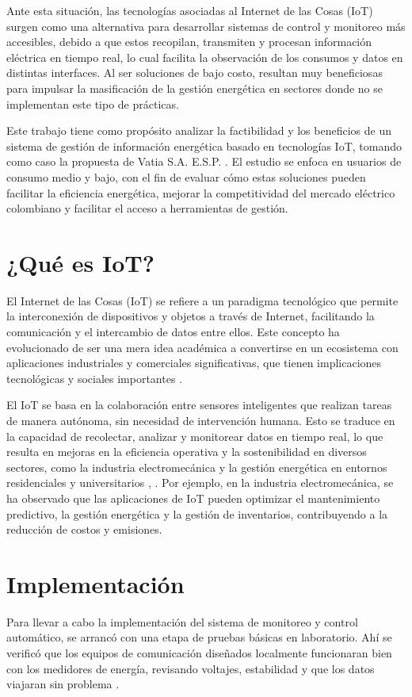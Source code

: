 Ante esta situación, las tecnologías asociadas al Internet de las Cosas (IoT) surgen como una alternativa para desarrollar sistemas de control y monitoreo más accesibles, debido a que estos recopilan, transmiten y procesan información eléctrica en tiempo real, lo cual facilita la observación de los consumos y datos en distintas interfaces. Al ser soluciones de bajo costo, resultan muy beneficiosas para impulsar la masificación de la gestión energética en sectores donde no se implementan este tipo de prácticas.

Este trabajo tiene como propósito analizar la factibilidad y los beneficios de un sistema de gestión de información energética basado en tecnologías IoT, tomando como caso la propuesta de Vatia S.A. E.S.P. \cite{Jaramillo2022}. El estudio se enfoca en usuarios de consumo medio y bajo, con el fin de evaluar cómo estas soluciones pueden facilitar la eficiencia energética, mejorar la competitividad del mercado eléctrico colombiano y facilitar el acceso a herramientas de gestión.

\section{¿Qué es IoT?}
El Internet de las Cosas (IoT) se refiere a un paradigma tecnológico que permite la interconexión de dispositivos y objetos a través de Internet, facilitando la comunicación y el intercambio de datos entre ellos. Este concepto ha evolucionado de ser una mera idea académica a convertirse en un ecosistema con aplicaciones industriales y comerciales significativas, que tienen implicaciones tecnológicas y sociales importantes \cite{MoralesTamayoYoandrys2025AdId}.

El IoT se basa en la colaboración entre sensores inteligentes que realizan tareas de manera autónoma, sin necesidad de intervención humana. Esto se traduce en la capacidad de recolectar, analizar y monitorear datos en tiempo real, lo que resulta en mejoras en la eficiencia operativa y la sostenibilidad en diversos sectores, como la industria electromecánica y la gestión energética en entornos residenciales y universitarios \cite{OlivaresGorritiEneko2022Eydd}, \cite{RomeroMacíasJavierVidal2025Adid}.
Por ejemplo, en la industria electromecánica, se ha observado que las aplicaciones de IoT pueden optimizar el mantenimiento predictivo, la gestión energética y la gestión de inventarios, contribuyendo a la reducción de costos y emisiones.


\section{Implementación}
Para llevar a cabo la implementación del sistema de monitoreo y control automático, se arrancó con una etapa de pruebas básicas en laboratorio. Ahí se verificó que los equipos de comunicación diseñados localmente funcionaran bien con los medidores de energía, revisando voltajes, estabilidad y que los datos viajaran sin problema \cite{Jaramillo2022}.


